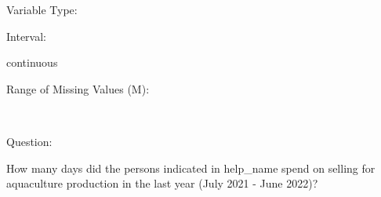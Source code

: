 \documentclass[
]{article}
\begin{document}
\begin{minipage}[t]{0.3\linewidth}

Variable Type:

\end{minipage}%
\begin{minipage}[t]{0.7\linewidth}

\end{minipage}

\begin{minipage}[t]{0.3\linewidth}

Interval:

\end{minipage}%
\begin{minipage}[t]{0.7\linewidth}

continuous

\end{minipage}

\begin{minipage}[t]{0.3\linewidth}

Range of Missing Values (M):

\end{minipage}%
\begin{minipage}[t]{0.7\linewidth}

~

\end{minipage}

\begin{minipage}[t]{0.3\linewidth}

Question:

\end{minipage}%
\begin{minipage}[t]{0.7\linewidth}

How many days did the persons indicated in help\_name spend on selling
for aquaculture production in the last year (July 2021 - June 2022)?

\end{minipage}

\begin{minipage}[t]{0.3\linewidth}

~

\end{minipage}%
\begin{minipage}[t]{0.7\linewidth}

~

\end{minipage}
 \vspace*{-6mm} 

\begin{minipage}[t]{0.3\linewidth}

~

\end{minipage}%
\begin{minipage}[t]{0.7\linewidth}

~

\end{minipage}
 \vspace*{-4mm} 
\end{document}
